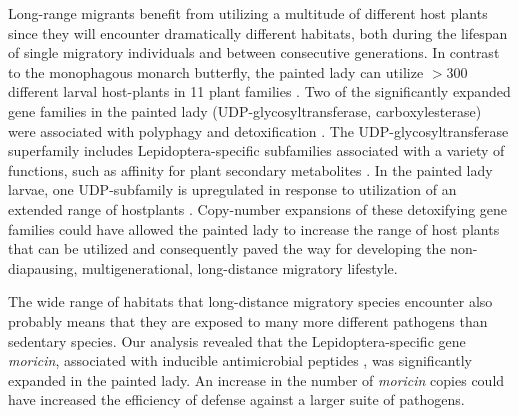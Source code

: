 \documentclass[twocolumn]{bmcart}%
\begin{document}
Long-range migrants benefit from utilizing a multitude of different host plants since they will encounter dramatically different habitats, both during the lifespan of single migratory individuals and between consecutive generations. In contrast to the monophagous monarch butterfly, the painted lady can utilize $>300$ different larval host-plants in 11 plant families \citep{celorio-manceraEvolutionaryHistoryHost2016, nylinHOSTPLANTUTILIZATION2014,ackery_hostplants_1988}. Two of the significantly expanded gene families in the painted lady (UDP-glycosyltransferase, carboxylesterase) were associated with polyphagy and detoxification \citep{breeschotenExpandingMenuAre2022, hatfieldCarboxylesterasesGeneralDetoxifying2016, nagareGlycosyltransferasesMultifacetedEnzymatic2021}. The UDP-glycosyltransferase superfamily includes Lepidoptera-specific subfamilies associated with a variety of functions, such as affinity for plant secondary metabolites \citep{huangUDPglucosyltransferaseMultigeneFamily2008, luqueCharacterizationNovelSilkworm2002}. In the painted lady larvae, one UDP-subfamily is upregulated in response to utilization of an extended range of hostplants \citep{celorio-manceraEvolutionaryHistoryHost2016}. Copy-number expansions of these detoxifying gene families could have allowed the painted lady to increase the range of host plants that can be utilized and consequently paved the way for developing the non-diapausing, multigenerational, long-distance migratory lifestyle. 

The wide range of habitats that long-distance migratory species encounter also probably means that they are exposed to many more different pathogens than sedentary species. Our analysis revealed that the Lepidoptera-specific gene \textit{moricin}, associated with inducible antimicrobial peptides \citep{haraMoricinNovelType1995}, was significantly expanded in the painted lady. An increase in the number of \textit{moricin} copies could have increased the efficiency of defense against a larger suite of pathogens.
\end{document}
